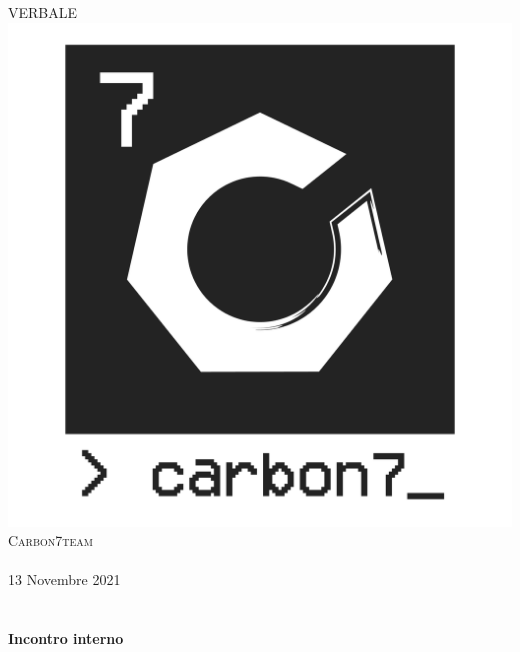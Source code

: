 \begin{center}
    \textsc{\huge VERBALE}\\[0.75cm] 
    \includegraphics[scale=0.25]{res/images/carbon7_small_logo-07.png}\\[1cm]
    \textsc{\Large Carbon7team}\\[0.3cm]
    \\[0.5cm]
    {\large 13 Novembre 2021}\\[0.5cm]
    \\[0.5cm]

    \HRule \\[0.4cm]
    {\huge \bfseries Incontro interno}\\[0.2cm]
    \HRule \\[1.5cm]


\end{center}
